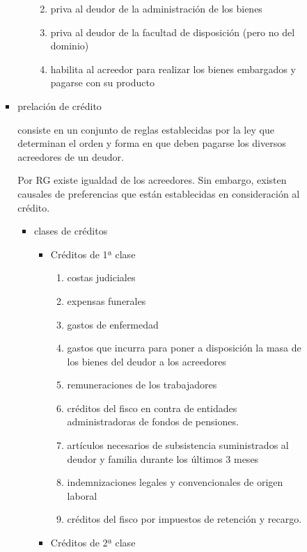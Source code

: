 \documentclass[]{article}
\providecommand{\tightlist}{%
  \setlength{\itemsep}{0pt}\setlength{\parskip}{0pt}}
\begin{document}
\begin{itemize}
\begin{itemize}
\begin{enumerate}
\begin{itemize}
\begin{itemize}
          \begin{enumerate}
          \def\labelenumii{\arabic{enumii}.}
          \tightlist
          \item
            priva al deudor de la administración de los bienes
          \item
            priva al deudor de la facultad de disposición (pero no del
            dominio)
          \item
            habilita al acreedor para realizar los bienes embargados y
            pagarse con su producto
          \end{enumerate}
        \end{itemize}
      \item
        prelación de crédito

        consiste en un conjunto de reglas establecidas por la ley que
        determinan el orden y forma en que deben pagarse los diversos
        acreedores de un deudor.

        Por RG existe igualdad de los acreedores. Sin embargo, existen
        causales de preferencias que están establecidas en consideración
        al crédito.

        \begin{itemize}
        \item
          clases de créditos

          \begin{itemize}
          \item
            Créditos de 1ª clase

            \begin{enumerate}
            \def\labelenumii{\arabic{enumii}.}
            \tightlist
            \item
              costas judiciales
            \item
              expensas funerales
            \item
              gastos de enfermedad
            \item
              gastos que incurra para poner a disposición la masa de los
              bienes del deudor a los acreedores
            \item
              remuneraciones de los trabajadores
            \item
              créditos del fisco en contra de entidades administradoras
              de fondos de pensiones.
            \item
              artículos necesarios de subsistencia suministrados al
              deudor y familia durante los últimos 3 meses
            \item
              indemnizaciones legales y convencionales de origen laboral
            \item
              créditos del fisco por impuestos de retención y recargo.
            \end{enumerate}
          \item
            Créditos de 2ª clase


\end{itemize}
\end{itemize}
\end{itemize}
\end{enumerate}
\end{itemize}
\end{itemize}
\end{document}
